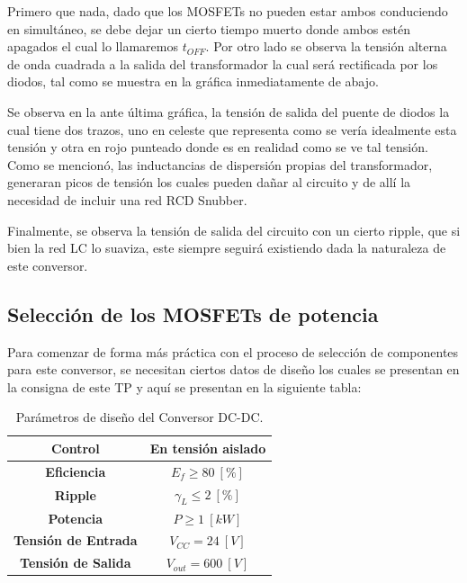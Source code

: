 \documentclass[12pt,a4paper]{article}
\begin{document}
Primero que nada, dado que los MOSFETs no pueden estar ambos conduciendo en simultáneo, se debe dejar un cierto tiempo muerto donde ambos estén apagados el cual lo llamaremos $t_{OFF}$. Por otro lado se observa la tensión alterna de onda cuadrada a la salida del transformador la cual será rectificada por los diodos, tal como se muestra en la gráfica inmediatamente de abajo.

Se observa en la ante última gráfica, la tensión de salida del puente de diodos la cual tiene dos trazos, uno en celeste que representa como se vería idealmente esta tensión y otra en rojo punteado donde es en realidad como se ve tal tensión. Como se mencionó, las inductancias de dispersión propias del transformador, generaran picos de tensión los cuales pueden dañar al circuito y de allí la necesidad de incluir una red RCD Snubber.

Finalmente, se observa la tensión de salida del circuito con un cierto ripple, que si bien la red LC lo suaviza, este siempre seguirá existiendo dada la naturaleza de este conversor.



\subsection{Selección de los MOSFETs de potencia}
Para comenzar de forma más práctica con el proceso de selección de componentes para este conversor, se necesitan ciertos datos de diseño los cuales se presentan en la consigna de este TP y aquí se presentan en la siguiente tabla:
\begin{table}[H]
    \centering
    \begin{tabular}{|c|c|} \hline
        \textbf{Control}            & En tensión aislado \\ \hline
        \textbf{Eficiencia}         & $E_{f} \geqslant 80 \ [\%]$ \\ \hline
        \textbf{Ripple}             & $\gamma_{L} \leqslant 2 \ [\%]$ \\ \hline
        \textbf{Potencia}           & $P \geqslant 1 \ [kW]$ \\ \hline
        \textbf{Tensión de Entrada} & $V_{CC} = 24 \ [V]$ \\ \hline
        \textbf{Tensión de Salida}  & $V_{out} = 600 \ [V]$ \\ \hline
    \end{tabular}
    \caption{Parámetros de diseño del Conversor DC-DC.}
    \label{tab:tab_1}
\end{table}
\end{document}
